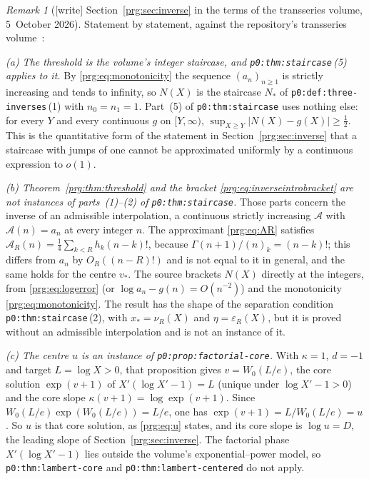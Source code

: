 \documentclass[11pt,letterpaper]{article}
\numberwithin{equation}{section}
\theoremstyle{definition}\newtheorem{definition}[theorem]{Definition}
\theoremstyle{remark}\newtheorem{remark}[theorem]{Remark}
\newcommand{\eps}{\varepsilon}
\newcommand{\file}[1]{\nolinkurl{#1}}
\begin{document}
\begin{remark}[{[write]} Section~\ref{prg:sec:inverse} in the terms of the transseries volume, 5~October 2026]\label{prg:rem:transseries}
Statement by statement, against the repository's transseries
volume~\cite{TSI}:

\emph{(a) The threshold is the volume's integer staircase, and
\file{p0:thm:staircase}\,(5) applies to it.} By \eqref{prg:eq:monotonicity}
the sequence $(a_n)_{n\ge1}$ is strictly increasing and tends to infinity, so
$N(X)$ is the staircase $N_\ast$ of \file{p0:def:three-inverses}\,(1) with
$n_0=n_1=1$. Part~(5) of \file{p0:thm:staircase} uses nothing else: for every
$Y$ and every continuous $g$ on $[Y,\infty)$,
$\sup_{X\ge Y}|N(X)-g(X)|\ge\frac12$. This is the quantitative form of the
statement in Section~\ref{prg:sec:inverse} that a staircase with jumps of one
cannot be approximated uniformly by a continuous expression to $o(1)$.

\emph{(b) Theorem~\ref{prg:thm:threshold} and the bracket
\eqref{prg:eq:inverseintrobracket} are not instances of parts~(1)--(2) of
\file{p0:thm:staircase}.} Those parts concern the inverse of an admissible
interpolation, a continuous strictly increasing $\mathcal A$ with
$\mathcal A(n)=a_n$ at every integer $n$. The approximant \eqref{prg:eq:AR}
satisfies $\mathcal A_R(n)=\frac14\sum_{k<R}h_k(n-k)!$, because
$\Gamma(n+1)/(n)_k=(n-k)!$; this differs from $a_n$ by $O_R((n-R)!)$ and is not
equal to it in general, and the same holds for the centre $v_*$. The source
brackets $N(X)$ directly at the integers, from \eqref{prg:eq:logerror} (or
$\log a_n-g(n)=O(n^{-2})$) and the monotonicity \eqref{prg:eq:monotonicity}.
The result has the shape of the separation condition
\file{p0:thm:staircase}\,(2), with $x_\ast=\nu_R(X)$ and $\eta=\eps_R(X)$, but it
is proved without an admissible interpolation and is not an instance of it.

\emph{(c) The centre $u$ is an instance of \file{p0:prop:factorial-core}.}
With $\kappa=1$, $d=-1$ and target $L=\log X>0$, that proposition gives
$v=W_0(L/e)$, the core solution $\exp(v+1)$ of $X'(\log X'-1)=L$ (unique under
$\log X'-1>0$) and the core slope $\kappa(v+1)=\log\exp(v+1)$. Since
$W_0(L/e)\exp(W_0(L/e))=L/e$, one has $\exp(v+1)=L/W_0(L/e)=u$. So $u$ is that
core solution, as \eqref{prg:eq:u} states, and its core slope is $\log u=D$,
the leading slope of Section~\ref{prg:sec:inverse}. The factorial phase
$X'(\log X'-1)$ lies outside the volume's exponential--power model, so
\file{p0:thm:lambert-core} and \file{p0:thm:lambert-centered} do not apply.


\end{remark}
\end{document}
